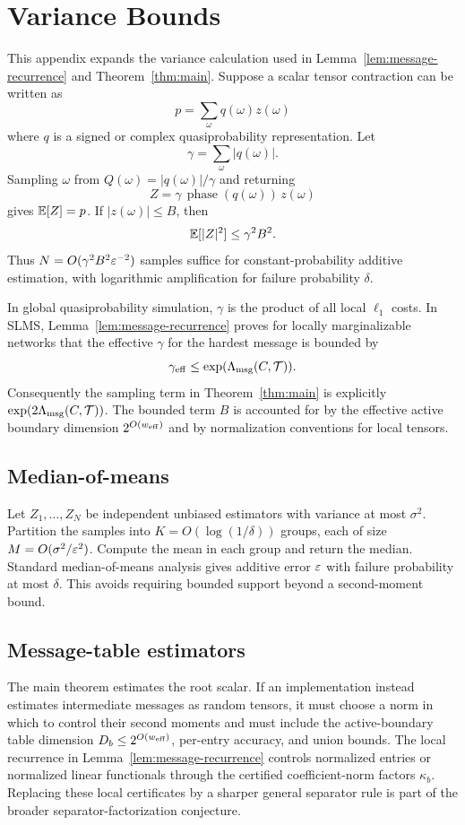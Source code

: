 \section{Variance Bounds}
\label{app:variance}

This appendix expands the variance calculation used in Lemma~\ref{lem:message-recurrence} and Theorem~\ref{thm:main}. Suppose a scalar tensor contraction can be written as
\[
p=\sum_{\omega} q(\omega) z(\omega)
\]
where \(q\) is a signed or complex quasiprobability representation. Let
\[
\gamma=\sum_{\omega}|q(\omega)|.
\]
Sampling \(\omega\) from \(Q(\omega)=|q(\omega)|/\gamma\) and returning
\[
Z=\gamma\,\operatorname{phase}(q(\omega))\,z(\omega)
\]
gives \(\mathbb{E}[Z]=p\). If \(|z(\omega)|\le B\), then
\[
\mathbb{E}[|Z|^2]\le \gamma^2 B^2.
\]
Thus \(N=O(\gamma^2B^2\varepsilon^{-2})\) samples suffice for constant-probability additive estimation, with logarithmic amplification for failure probability \(\delta\).

In global quasiprobability simulation, \(\gamma\) is the product of all local \(\ell_1\) costs. In SLMS, Lemma~\ref{lem:message-recurrence} proves for locally marginalizable networks that the effective \(\gamma\) for the hardest message is bounded by
\[
\gamma_{\mathrm{eff}}\le \exp(\Lambda_{\mathrm{msg}}(C,\mathcal{T})).
\]
Consequently the sampling term in Theorem~\ref{thm:main} is explicitly \(\exp(2\Lambda_{\mathrm{msg}}(C,\mathcal{T}))\). The bounded term \(B\) is accounted for by the effective active boundary dimension \(2^{O(w_{\mathrm{eff}})}\) and by normalization conventions for local tensors.

\subsection{Median-of-means}

Let \(Z_1,\ldots,Z_N\) be independent unbiased estimators with variance at most \(\sigma^2\). Partition the samples into \(K=O(\log(1/\delta))\) groups, each of size \(M=O(\sigma^2/\varepsilon^2)\). Compute the mean in each group and return the median. Standard median-of-means analysis gives additive error \(\varepsilon\) with failure probability at most \(\delta\). This avoids requiring bounded support beyond a second-moment bound.

\subsection{Message-table estimators}

The main theorem estimates the root scalar. If an implementation instead estimates intermediate messages as random tensors, it must choose a norm in which to control their second moments and must include the active-boundary table dimension \(D_b\le 2^{O(w_{\mathrm{eff}})}\), per-entry accuracy, and union bounds. The local recurrence in Lemma~\ref{lem:message-recurrence} controls normalized entries or normalized linear functionals through the certified coefficient-norm factors \(\kappa_b\). Replacing these local certificates by a sharper general separator rule is part of the broader separator-factorization conjecture.

